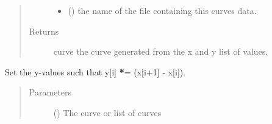 \documentclass[letterpaper,10pt,english]{sphinxmanual}
\begin{document}
\begin{fulllineitems}
\begin{quote}
\begin{description}
\begin{itemize}
\item {} 
 () \textendash{} the name of the file containing this curves data.

\end{itemize}

\item[{Returns}] \leavevmode
curve \textendash{} the curve generated from the x and y list of values.

\end{description}\end{quote}

\end{fulllineitems}


\begin{fulllineitems}
\label{\detokenize{pydv:pydvpy.makeextensive}}
Set the y-values such that y{[}i{]} {\color{red}\bfseries{}*}= (x{[}i+1{]} - x{[}i{]}).

\begin{sphinxVerbatim}[commandchars=\\\{\}]
  
\end{sphinxVerbatim}

\begin{sphinxVerbatim}[commandchars=\\\{\}]
\end{sphinxVerbatim}

\begin{sphinxVerbatim}[commandchars=\\\{\}]
 
\end{sphinxVerbatim}
\begin{quote}\begin{description}
\item[{Parameters}] \leavevmode
{} ({\hyperref[\detokenize{pydv:curve.Curve}]{}}) \textendash{} The curve or list of curves

\end{description}\end{quote}

\end{fulllineitems}
\end{document}
